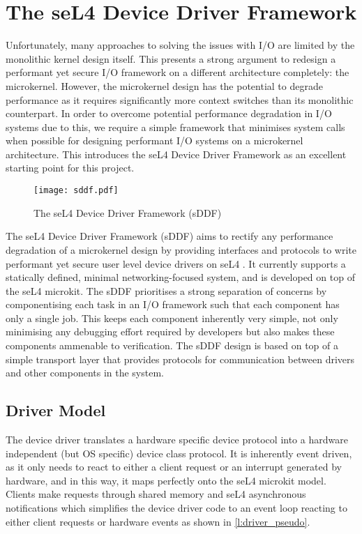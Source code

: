 \chapter{The seL4 Device Driver Framework}\label{ch:sddf}
Unfortunately, many approaches to solving the issues with I/O are limited 
by the monolithic kernel design itself. This presents a strong argument to
redesign a performant yet secure I/O framework on a different architecture completely: the microkernel.
However, the microkernel design has the potential to degrade performance as it requires
significantly more context switches than its monolithic counterpart.
In order to overcome potential performance degradation in I/O systems due to this, we require a simple
framework that minimises system calls when possible for designing performant I/O systems on a microkernel architecture.
This introduces the seL4 Device Driver Framework as an excellent starting point for this project.\\

\begin{figure}[h]
    \centering
    \texttt{[image: sddf.pdf]}
    \caption{The seL4 Device Driver Framework (sDDF) \cite{Parker_22:sddf}}
    \label{f:sddf}
\end{figure}

The seL4 Device Driver Framework (sDDF) aims to rectify any performance degradation of a microkernel
design by providing interfaces and protocols to write performant yet secure user level device
drivers on seL4 \cite{Parker_22:sddf}. It currently supports a statically defined, minimal networking-focused system, and is 
developed on top of the seL4 microkit. The sDDF prioritises a strong separation of 
concerns by componentising each task in an I/O framework such that each component has only a 
single job. This keeps each component inherently very simple, not only minimising any debugging effort required by 
developers but also makes these components ammenable to verification. The sDDF design is based on
top of a simple transport layer that provides protocols for communication between drivers and other
components in the system.

\section{Driver Model}\label{s:driver_model}
The device driver translates a hardware specific device protocol into a hardware independent
(but OS specific) device class protocol. It is inherently event driven, as it only needs to react to
either a client request or an interrupt generated by hardware, and in this way, it maps perfectly onto
the seL4 microkit model. Clients make requests through shared memory and seL4 asynchronous notifications
which simplifies the device driver code to an event loop reacting to either client requests or hardware
events as shown in \autoref{l:driver_pseudo}. 

